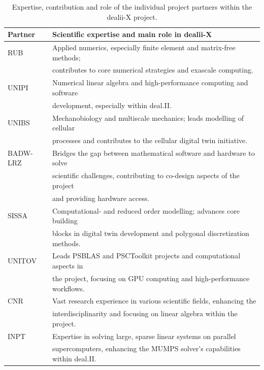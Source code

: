 \documentclass[a4paper,12pt]{article}
\begin{document}
\begin{center}
    \small
    \renewcommand{\arraystretch}{1.25}
    \begin{longtable}{|l|l|}
    \caption{Expertise, contribution and role of the individual project partners within the dealii-X project.}
    \label{tab:roles_within_project}
    \\
    \hline
    \textbf{Partner} & \textbf{Scientific expertise and main role in dealii-X} \\
    \hline
    RUB   & 
    Applied numerics, especially finite element and matrix-free methods;
    \\
    & contributes to core numerical strategies and exascale computing. 
    \\
    UNIPI & 
    Numerical linear algebra and high-performance computing and software\\
    & development, especially within deal.II.
    \\
    UNIBS & 
    Mechanobiology and multiscale mechanics; leads modelling of cellular\\
    & processes and contributes to the cellular digital twin initiative.
    \\
    BADW-LRZ & 
    Bridges the gap between mathematical software and hardware to solve\\
    & scientific challenges, contributing to co-design aspects of the project \\
    & and providing hardware access.
    \\
    SISSA & 
    Computational- and reduced order modelling; advances core building\\
    & blocks in digital twin development and polygonal discretization methods.
    \\
    UNITOV & 
    Leads PSBLAS and PSCToolkit projects and computational aspects in\\
    & the project, focusing on GPU computing and high-performance workflows.
    \\
    CNR & 
    Vast research experience in various scientific fields, enhancing the\\
    & interdisciplinarity and focusing on linear algebra within the project.
    \\
    INPT & 
    Expertise in solving large, sparse linear systems on parallel\\
    & supercomputers, enhancing the MUMPS solver's capabilities within deal.II. 
    \\

\end{longtable}
\end{center}
\end{document}

